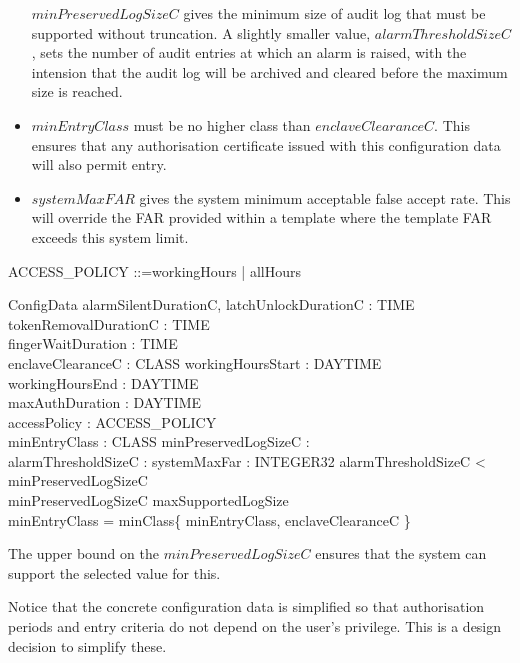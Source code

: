 \begin{itemize}
$minPreservedLogSizeC$ gives the minimum size of audit log that must be supported without
truncation.  A slightly smaller
value, $alarmThresholdSizeC$,
sets the number of audit entries at which an alarm is raised, 
with the intension that the
audit log will be archived and cleared before the maximum size is
reached.
\item
$minEntryClass$ must be no higher class than $enclaveClearanceC$. This
ensures that any authorisation certificate issued with this
configuration data will also permit entry.
\item
$systemMaxFAR$ gives the system minimum acceptable false accept rate. This
will override the FAR provided within a template where the template
FAR exceeds this system limit.
\end{itemize}

\begin{zed}
        ACCESS\_POLICY ::=workingHours | allHours
\end{zed}

\begin{schema}{ConfigData}
	alarmSilentDurationC, latchUnlockDurationC : TIME
\\      tokenRemovalDurationC : TIME
\\      fingerWaitDuration : TIME
\\      enclaveClearanceC : CLASS
\also
        workingHoursStart : DAYTIME
\\      workingHoursEnd : DAYTIME
\\      maxAuthDuration : DAYTIME
\\      accessPolicy : ACCESS\_POLICY
\\      minEntryClass : CLASS 
\also
        minPreservedLogSizeC : \nat
\\      alarmThresholdSizeC : \nat
\also
        systemMaxFar : INTEGER32
\where
        alarmThresholdSizeC < minPreservedLogSizeC   
\\      minPreservedLogSizeC \leq maxSupportedLogSize
\\      minEntryClass = minClass\{ minEntryClass, enclaveClearanceC \}
\end{schema}
\begin{Zcomment}
\item
The upper bound on the $minPreservedLogSizeC$ ensures that the system can
support the selected value for this.
\end{Zcomment}

Notice that the concrete configuration data is simplified so that
authorisation periods and entry criteria do not depend on the user's
privilege. This is a design decision to simplify
these. 

